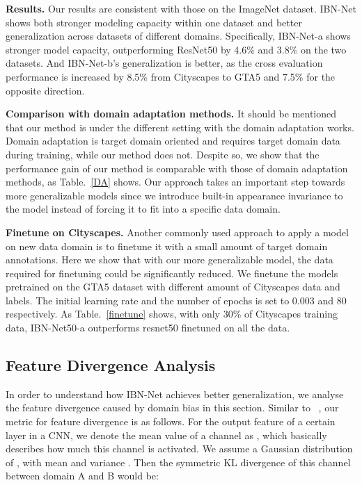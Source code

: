 \documentclass[runningheads]{llncs}
\begin{document}
\textbf{Results.} 
Our results are consistent with those on the ImageNet dataset.
IBN-Net shows both stronger modeling capacity within one dataset and better generalization across datasets of different domains.
Specifically, IBN-Net-a shows stronger model capacity, outperforming ResNet50 by 4.6\% and 3.8\% on the two datasets.
And IBN-Net-b's generalization is better, as the cross evaluation performance is increased by 8.5\% from Cityscapes to GTA5 and 7.5\% for the opposite direction.


\textbf{Comparison with domain adaptation methods.} It should be mentioned that our method is under the different setting with the domain adaptation works.
Domain adaptation is target domain oriented and requires target domain data during training, while our method does not.
Despite so, we show that the performance gain of our method is comparable with those of domain adaptation methods, as Table.~\ref{DA} shows.
Our approach takes an important step towards more generalizable models since we introduce built-in appearance invariance to the model instead of forcing it to fit into a specific data domain.

\textbf{Finetune on Cityscapes.} Another commonly used approach to apply a model on new data domain is to finetune it with a small amount of target domain annotations.
Here we show that with our more generalizable model, the data required for finetuning could be significantly reduced.
We finetune the models pretrained on the GTA5 dataset with different amount of Cityscapes data and labels.
The initial learning rate and the number of epochs is set to 0.003 and 80 respectively.
As Table.~\ref{finetune} shows, with only 30\% of Cityscapes training data, IBN-Net50-a outperforms resnet50 finetuned on all the data.

\subsection{Feature Divergence Analysis}

In order to understand how IBN-Net achieves better generalization, we analyse the feature divergence caused by domain bias in this section.
Similar to ~\cite{li2016revisiting}, our metric for feature divergence is as follows. 
For the output feature of a certain layer in a CNN, we denote the mean value of a channel as , which basically describes how much this channel is activated.
We assume a Gaussian distribution of , with mean  and variance .
Then the symmetric KL divergence of this channel between domain A and B would be:
\end{document}
